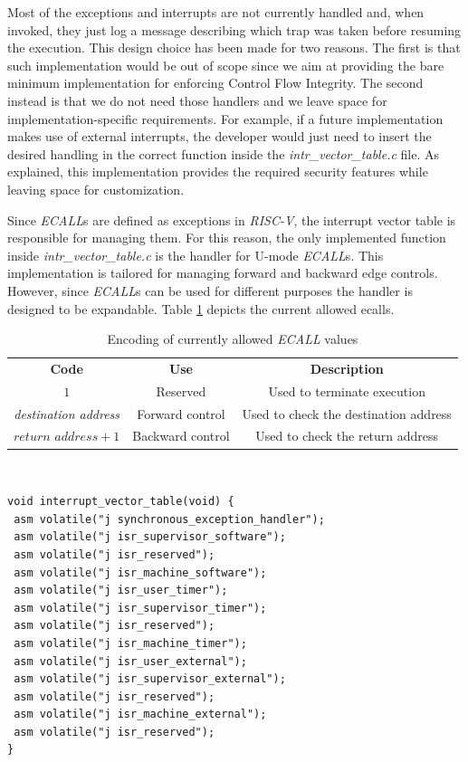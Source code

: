 Most of the exceptions and interrupts are not currently handled and, when
invoked, they just log a message describing which trap was taken before resuming
the execution. This design choice has been made for two reasons. The first is that
such implementation would be out of scope since we aim at providing the bare minimum
implementation for enforcing Control Flow Integrity. The second instead is that
we do not need those handlers and we leave space for implementation-specific
requirements. For example, if a future implementation makes use of external
interrupts, the developer would just need to insert the desired handling in the correct
function inside the \textit{intr\_vector\_table.c} file. As explained, this
implementation provides the required security features while leaving space for
customization.

Since \textit{ECALL}s are defined as exceptions in \textit{RISC-V}, the
interrupt vector table is responsible for managing them. For this reason, the
only implemented function inside \textit{intr\_vector\_table.c} is the handler for
U-mode \textit{ECALL}s. This implementation is tailored for managing forward and
backward edge controls. However, since \textit{ECALL}s can be used for different
purposes the handler is designed to be expandable. Table \ref{tab:ecalls} depicts
the current allowed ecalls.
\begin{table}
  \centering
  \begin{tabular}{|c|c|c|}
    \hline
    \textbf{Code}                & \textbf{Use}     & \textbf{Description}                  \\
    \hhline{===} $1$             & Reserved         & Used to terminate execution           \\
    \hline
    \textit{destination address} & Forward control  & Used to check the destination address \\
    \hline
    $\textit{return address}+ 1$ & Backward control & Used to check the return address      \\
    \hline
  \end{tabular}
  \caption{Encoding of currently allowed \textit{ECALL} values}
  \label{tab:ecalls}
\end{table}
\\
\begin{lstlisting}[style=CStyle, caption = Interrput Vector Table, label={lst:intrtable}]
void interrupt_vector_table(void) {
 asm volatile("j synchronous_exception_handler");
 asm volatile("j isr_supervisor_software");
 asm volatile("j isr_reserved");
 asm volatile("j isr_machine_software");
 asm volatile("j isr_user_timer");
 asm volatile("j isr_supervisor_timer");
 asm volatile("j isr_reserved");
 asm volatile("j isr_machine_timer");
 asm volatile("j isr_user_external");
 asm volatile("j isr_supervisor_external");
 asm volatile("j isr_reserved");
 asm volatile("j isr_machine_external");
 asm volatile("j isr_reserved");
}
\end{lstlisting}

